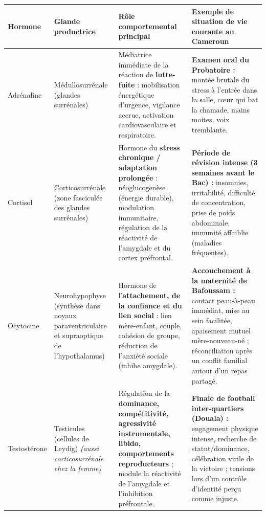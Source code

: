 \documentclass[11pt]{article}
\newcommand{\cle}[1]{{\popxbold\color{popdark}#1}}
\begin{document}
\begin{corrige}
\begin{center}
\begin{tabularx}{\linewidth}{|l|X|X|X|}
\hline
\rowcolor{popblueL} \textbf{Hormone} & \textbf{Glande productrice} & \textbf{Rôle comportemental principal} & \textbf{Exemple de situation de vie courante au Cameroun} \\
\hline
\cle{Adrénaline} & Médullosurrénale (glandes surrénales) & Médiatrice immédiate de la réaction de \textbf{lutte-fuite} : mobilisation énergétique d'urgence, vigilance accrue, activation cardiovasculaire et respiratoire. & \textbf{Examen oral du Probatoire :} montée brutale du stress à l'entrée dans la salle, cœur qui bat la chamade, mains moites, voix tremblante. \\
\hline
\cle{Cortisol} & Corticosurrénale (zone fasciculée des glandes surrénales) & Hormone du \textbf{stress chronique / adaptation prolongée} : néoglucogenèse (énergie durable), modulation immunitaire, régulation de la réactivité de l'amygdale et du cortex préfrontal. & \textbf{Période de révision intense (3 semaines avant le Bac) :} insomnies, irritabilité, difficulté de concentration, prise de poids abdominale, immunité affaiblie (maladies fréquentes). \\
\hline
\cle{Ocytocine} & Neurohypophyse (synthèse dans noyaux paraventriculaire et supraoptique de l'hypothalamus) & Hormone de l'\textbf{attachement, de la confiance et du lien social} : lien mère-enfant, couple, cohésion de groupe, réduction de l'anxiété sociale (inhibe amygdale). & \textbf{Accouchement à la maternité de Bafoussam :} contact peau-à-peau immédiat, mise au sein facilitée, apaisement mutuel mère-nouveau-né ; réconciliation après un conflit familial autour d'un repas partagé. \\
\hline
\cle{Testostérone} & Testicules (cellules de Leydig) \textit{(aussi corticosurrénale chez la femme)} & Régulation de la \textbf{dominance, compétitivité, agressivité instrumentale, libido, comportements reproducteurs} ; module la réactivité de l'amygdale et l'inhibition préfrontale. & \textbf{Finale de football inter-quartiers (Douala) :} engagement physique intense, recherche de statut/dominance, célébration virile de la victoire ; tensions lors d'un contrôle d'identité perçu comme injuste. \\
\hline
\end{tabularx}
\end{center}
\end{corrige}
\end{document}
